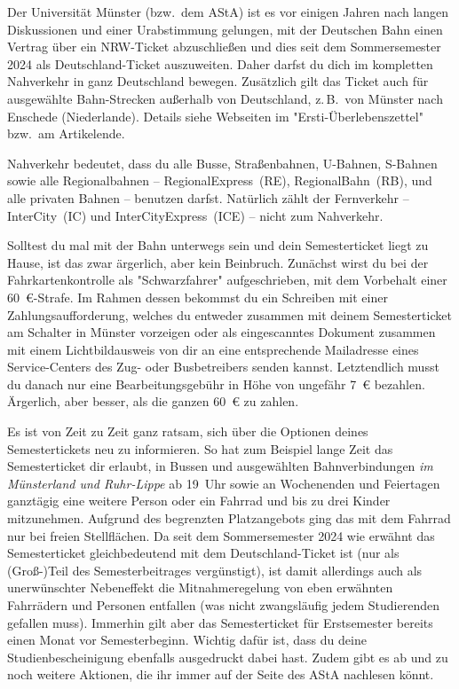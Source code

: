 \begin{multicols*}{2}
Der Universität Münster (bzw.\ dem AStA) ist es vor einigen Jahren nach langen Diskussionen und einer Urabstimmung gelungen, mit der Deutschen Bahn einen Vertrag über ein NRW-Ticket abzuschließen und dies seit dem Sommersemester 2024 als Deutschland-Ticket auszuweiten.
Daher darfst du dich im kompletten Nahverkehr in ganz Deutschland bewegen.
Zusätzlich gilt das Ticket auch für ausgewählte Bahn-Strecken außerhalb von Deutschland, z.\,B.\ von Münster nach Enschede (Niederlande). Details siehe Webseiten im "Ersti-Überlebenszettel" bzw.\ am Artikelende.

Nahverkehr bedeutet, dass du alle Busse, Straßenbahnen, U-Bahnen, S-Bahnen sowie alle Regionalbahnen -- RegionalExpress~(RE), RegionalBahn~(RB), und alle privaten Bahnen -- benutzen darfst.
Natürlich zählt der Fernverkehr -- InterCity~(IC) und InterCityExpress~(ICE) -- nicht zum Nahverkehr.

Solltest du mal mit der Bahn unterwegs sein und dein Semesterticket liegt zu Hause, ist das zwar ärgerlich, aber kein Beinbruch.
Zunächst wirst du bei der Fahrkartenkontrolle als "Schwarzfahrer" aufgeschrieben, mit dem Vorbehalt einer \SI{60}{\euro}-Strafe.
Im Rahmen dessen bekommst du ein Schreiben mit einer Zahlungsaufforderung, welches du entweder zusammen mit deinem Semesterticket am Schalter in Münster vorzeigen oder als eingescanntes Dokument zusammen mit einem Lichtbildausweis von dir an eine entsprechende Mailadresse eines Service-Centers des Zug- oder Busbetreibers senden kannst.  
Letztendlich musst du danach nur eine Bearbeitungsgebühr in Höhe von ungefähr \SI{7}{\euro} bezahlen. Ärgerlich, aber besser, als die ganzen \SI{60}{\euro} zu zahlen.

Es ist von Zeit zu Zeit ganz ratsam, sich über die Optionen deines Semestertickets neu zu informieren.
So hat zum Beispiel lange Zeit das Semesterticket dir erlaubt, in Bussen und ausgewählten Bahnverbindungen \emph{im Münsterland und Ruhr-Lippe} ab 19~Uhr sowie an Wochenenden und Feiertagen ganztägig eine weitere Person oder ein Fahrrad und bis zu drei Kinder mitzunehmen. Aufgrund des begrenzten Platzangebots ging das mit dem Fahrrad nur bei freien Stellflächen.
Da seit dem Sommersemester 2024 wie erwähnt das Semesterticket gleichbedeutend mit dem Deutschland-Ticket ist (nur als (Groß-)Teil des Semesterbeitrages vergünstigt), ist damit allerdings auch als unerwünschter Nebeneffekt die Mitnahmeregelung von eben erwähnten Fahrrädern und Personen entfallen (was nicht zwangsläufig jedem Studierenden gefallen muss). 
Immerhin gilt aber das Semesterticket für Erstsemester bereits einen Monat vor Semesterbeginn. Wichtig dafür ist, dass du deine Studienbescheinigung ebenfalls ausgedruckt dabei hast. Zudem gibt es ab und zu noch weitere Aktionen, die ihr immer auf der Seite des AStA nachlesen könnt. 


\end{multicols*}
